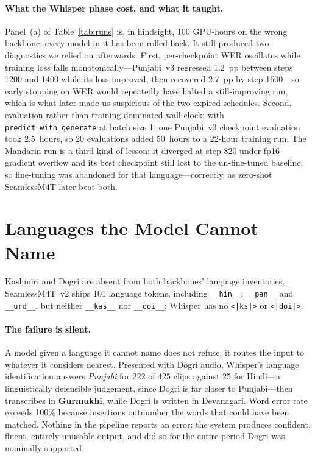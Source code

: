 \documentclass[sigconf,anonymous,review]{acmart}
\begin{document}
\paragraph{What the Whisper phase cost, and what it taught.} Panel~(a) of
Table~\ref{tab:runs} is, in hindsight, 100 GPU-hours on the wrong backbone;
every model in it has been rolled back. It still produced two diagnostics we
relied on afterwards. First, per-checkpoint WER oscillates while training loss
falls monotonically---Punjabi~v3 regressed 1.2~pp between steps 1200 and 1400
while its loss improved, then recovered 2.7~pp by step 1600---so early stopping
on WER would repeatedly have halted a still-improving run, which is what later
made us suspicious of the two expired schedules. Second, evaluation rather than
training dominated wall-clock: with \texttt{predict\_with\_generate} at batch
size 1, one Punjabi~v3 checkpoint evaluation took 2.5~hours, so 20 evaluations
added 50~hours to a 22-hour training run. The Mandarin run is a third kind of
lesson: it diverged at step 820 under fp16 gradient overflow and its best
checkpoint still lost to the un-fine-tuned baseline, so fine-tuning was
abandoned for that language---correctly, as zero-shot SeamlessM4T later beat
both.

\section{Languages the Model Cannot Name}
\label{sec:unsupported}

Kashmiri and Dogri are absent from both backbones' language inventories.
SeamlessM4T~v2 ships 101 language tokens, including \texttt{\_\_hin\_\_},
\texttt{\_\_pan\_\_} and \texttt{\_\_urd\_\_}, but neither \texttt{\_\_kas\_\_}
nor \texttt{\_\_doi\_\_}; Whisper has no \texttt{<|ks|>} or \texttt{<|doi|>}.

\paragraph{The failure is silent.} A model given a language it cannot name does
not refuse; it routes the input to whatever it considers nearest. Presented with
Dogri audio, Whisper's language identification answers \emph{Punjabi} for 222 of
425 clips against 25 for Hindi---a linguistically defensible judgement, since
Dogri is far closer to Punjabi---then transcribes in \textbf{Gurmukhi}, while
Dogri is written in Devanagari. Word error rate exceeds 100\% because insertions
outnumber the words that could have been matched. Nothing in the pipeline
reports an error; the system produces confident, fluent, entirely unusable
output, and did so for the entire period Dogri was nominally supported.
\end{document}
